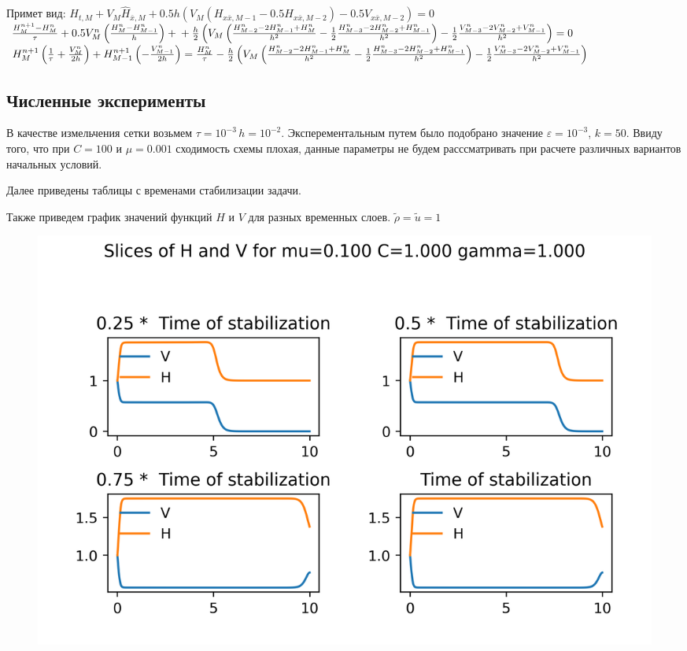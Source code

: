 Примет вид: 
$
H_{t,M} + V_M\hat{H}_{\bar{x}, M} + 0.5h(V_M(H_{x\bar{x},M-1} - 0.5H_{x\bar{x},M-2}) - 0.5 V_{x\bar{x},M-2}) = 0
$\\

$
\frac{H_M^{n+1} - H_M^n}{\tau} + 0.5V_M^n\left(\frac{H_{M}^n-H_{M-1}^n}{h}\right) + \\
+ \frac{h}{2}\left(V_M\left(\frac{H_{M-2}^n-2H_{M-1}^n + H_{M}^n}{h^2} -\frac{1}{2}\frac{H_{M-3}^n-2H_{M-2}^n + H_{M-1}^n}{h^2}\right) -\frac{1}{2}\frac{V_{M-3}^n - 2V_{M-2}^n + V_{M-1}^n}{h^2}\right) = 0
$\\

$
H_M^{n+1}\left(\frac{1}{\tau} + \frac{V_M^n}{2h}\right) + H_{M-1}^{n+1}\left(-\frac{V_{M-1}^n}{2h}\right) = \frac{H_M^n}{\tau} - \\ \frac{h}{2}\left(V_M\left(\frac{H_{M-2}^n-2H_{M-1}^n + H_{M}^n}{h^2} -\frac{1}{2}\frac{H_{M-3}^n-2H_{M-2}^n + H_{M-1}^n}{h^2}\right) -\frac{1}{2}\frac{V_{M-3}^n - 2V_{M-2}^n + V_{M-1}^n}{h^2}\right)
$\\

\newpage
\subsection{Численные эксперименты}
В качестве измельчения сетки возьмем $\tau = 10^{-3} \, h = 10^{-2}$. Эксперементальным путем было подобрано значение $\varepsilon = 10^{-3}$, $k = 50$. Ввиду того, что при $C = 100$ и $\mu = 0.001$ сходимость схемы плохая, данные параметры не будем расссматривать при расчете различных вариантов начальных условий.


Далее приведены таблицы с временами стабилизации задачи.




\newpage




\newpage
Также приведем график значений функций $H$ и $V$ для разных временных слоев. $\tilde{\rho} = \tilde{u} = 1$

\begin{figure}[H]
	\centering
	\includegraphics[scale=1.1]{../graph_data_flow/Slices_mu0.100_C1.000_gamma1.000.png}
\end{figure}


